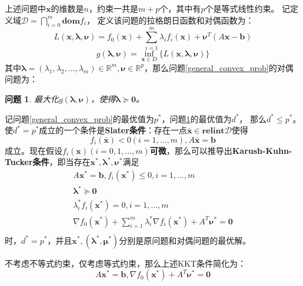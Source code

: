 \documentclass{article}
\newtheorem{problem}{问题}
\begin{document}
上述问题中$\bm x$的维数是$n$，约束一共是$m+p$个，其中有$p$个是等式线性约束。
记定义域$\mathcal{D}=\bigcap\limits_{i=0}^{m}\textbf{dom}f_i$，
定义该问题的拉格朗日函数和对偶函数为：
\begin{equation}
    L(\bm x,\bm\lambda, \bm\nu)=f_0(\bm x)+\sum\limits_{i=1}^m\lambda_if_i(\bm x)+\bm\nu^T(A\bm x-\bm b)\label{lagrange_function}
\end{equation}
\begin{equation}
    g(\bm\lambda, \bm\nu)=\inf_{\bm x\in D}\{L(\bm x,\bm\lambda, \bm\nu)\}\label{dual_function}
\end{equation}
其中$\bm\lambda=(\lambda_1,\lambda_2,...,\lambda_m)\in\mathbb R^m,\bm\nu\in\mathbb{R}^p$，那么问题\ref{general_convex_prob}的对偶问题为：
\begin{problem}
最大化$g(\bm\lambda,\bm\nu)$，使得$\bm\lambda\succeq\bm 0$。\label{dual_problem}
\end{problem}

记问题\ref{general_convex_prob}的最优值为$p^*$，问题\ref{dual_problem}的最优值为$d^*$，
那么$d^*\le p^*$。使$d^*=p^*$成立的一个条件是\textbf{Slater条件}：存在一点$\bar{\bm x}\in \textbf{relint}\mathcal D$使得
$$f_i(\bar{\bm x})<0(i=1,...,m),A\bar{\bm x}=\bm b$$
成立。现在假设$f_i(\bm x)(i=0,1,...,m)$\textbf{可微}，那么可以推导出\textbf{Karush-Kuhn-Tucker条件}，即当存在$\bm x^*,\bm\lambda^*,\bm\nu^*$满足
\begin{equation}
    \label{kkt}
    \begin{gathered}
    A\bm x^*=\bm b,f_i(\bm x^*)\le 0,i=1,...,m \\
    \bm\lambda^*\succeq \bm 0 \\
    \lambda^*_if_i(\bm x^*)=0,i=1,...,m\\
    \nabla f_0(\bm x^*)+\sum\limits_{i=1}^m{\lambda^*_i}\nabla f_i(\bm x^*)+A^T\bm\nu^*=\bm 0\\
    \end{gathered}
\end{equation}
时，$d^*=p^*$，并且$\bm x^*,(\bm\lambda^*,\bm\mu^*)$分别是原问题和对偶问题的最优解。

不考虑不等式约束，仅考虑等式约束，那么上述KKT条件简化为：
\begin{equation}
    A\bm x^*=\bm b,\nabla f_0(\bm x^*)+A^T\bm\nu ^*=\bm 0\label{equation_constraint_kkt}
\end{equation}
\end{document}
